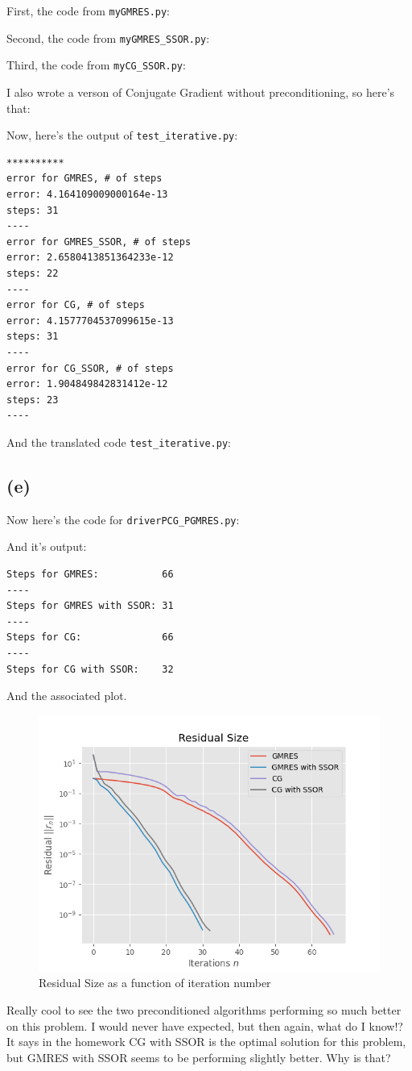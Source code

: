 \documentclass[boxes,pages]{homework}
\begin{document}
\begin{solution}
	First, the code from \verb|myGMRES.py|:
	
	\newpage
	Second, the code from \verb|myGMRES_SSOR.py|:
	
	\newpage
	Third, the code from \verb|myCG_SSOR.py|:
	
	\newpage
	I also wrote a verson of Conjugate Gradient without preconditioning, so here's that:
	
	Now, here's the output of \verb|test_iterative.py|:
	\begin{verbatim}
**********
error for GMRES, # of steps
error: 4.164109009000164e-13
steps: 31
----
error for GMRES_SSOR, # of steps
error: 2.6580413851364233e-12
steps: 22
----
error for CG, # of steps
error: 4.1577704537099615e-13
steps: 31
----
error for CG_SSOR, # of steps
error: 1.904849842831412e-12
steps: 23
----
\end{verbatim}
	And the translated code \verb|test_iterative.py|:
	

	\subsection*{(e)}
	Now here's the code for \verb|driverPCG_PGMRES.py|:
	
	And it's output:
	\begin{verbatim}
Steps for GMRES:           66
----
Steps for GMRES with SSOR: 31
----
Steps for CG:              66
----
Steps for CG with SSOR:    32
  \end{verbatim}
	And the associated plot.
	\begin{figure}[h]
		\centering
		\includegraphics[width=\textwidth]{ressize.png}
		\caption{Residual Size as a function of iteration number}
	\end{figure}
	Really cool to see the two preconditioned algorithms performing so much better on this problem. I would never have expected, but then again, what do I know!? It says in the homework CG with SSOR is the optimal solution for this problem, but GMRES with SSOR seems to be performing slightly better. Why is that?


\end{solution}
\end{document}

